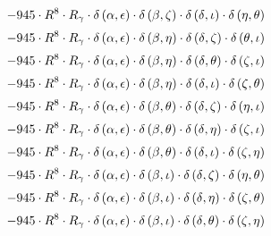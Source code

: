 \begin{subequations}
\begin{gather}
 \\[0.2em] \notag 		 - 945 \cdot R^{8} \cdot R_{\gamma{}} \cdot \delta{}\left(\alpha{}, \epsilon{}\right) \cdot \delta{}\left(\beta{}, \zeta{}\right) \cdot \delta{}\left(\delta{}, \iota{}\right) \cdot \delta{}\left(\eta{}, \theta{}\right) 
 \\[0.2em] \notag 		 - 945 \cdot R^{8} \cdot R_{\gamma{}} \cdot \delta{}\left(\alpha{}, \epsilon{}\right) \cdot \delta{}\left(\beta{}, \eta{}\right) \cdot \delta{}\left(\delta{}, \zeta{}\right) \cdot \delta{}\left(\theta{}, \iota{}\right) 
 \\[0.2em] \notag 		 - 945 \cdot R^{8} \cdot R_{\gamma{}} \cdot \delta{}\left(\alpha{}, \epsilon{}\right) \cdot \delta{}\left(\beta{}, \eta{}\right) \cdot \delta{}\left(\delta{}, \theta{}\right) \cdot \delta{}\left(\zeta{}, \iota{}\right) 
 \\[0.2em] \notag 		 - 945 \cdot R^{8} \cdot R_{\gamma{}} \cdot \delta{}\left(\alpha{}, \epsilon{}\right) \cdot \delta{}\left(\beta{}, \eta{}\right) \cdot \delta{}\left(\delta{}, \iota{}\right) \cdot \delta{}\left(\zeta{}, \theta{}\right) 
 \\[0.2em] \notag 		 - 945 \cdot R^{8} \cdot R_{\gamma{}} \cdot \delta{}\left(\alpha{}, \epsilon{}\right) \cdot \delta{}\left(\beta{}, \theta{}\right) \cdot \delta{}\left(\delta{}, \zeta{}\right) \cdot \delta{}\left(\eta{}, \iota{}\right) 
 \\[0.2em] \notag 		 - 945 \cdot R^{8} \cdot R_{\gamma{}} \cdot \delta{}\left(\alpha{}, \epsilon{}\right) \cdot \delta{}\left(\beta{}, \theta{}\right) \cdot \delta{}\left(\delta{}, \eta{}\right) \cdot \delta{}\left(\zeta{}, \iota{}\right) 
 \\[0.2em] \notag 		 - 945 \cdot R^{8} \cdot R_{\gamma{}} \cdot \delta{}\left(\alpha{}, \epsilon{}\right) \cdot \delta{}\left(\beta{}, \theta{}\right) \cdot \delta{}\left(\delta{}, \iota{}\right) \cdot \delta{}\left(\zeta{}, \eta{}\right) 
 \\[0.2em] \notag 		 - 945 \cdot R^{8} \cdot R_{\gamma{}} \cdot \delta{}\left(\alpha{}, \epsilon{}\right) \cdot \delta{}\left(\beta{}, \iota{}\right) \cdot \delta{}\left(\delta{}, \zeta{}\right) \cdot \delta{}\left(\eta{}, \theta{}\right) 
 \\[0.2em] \notag 		 - 945 \cdot R^{8} \cdot R_{\gamma{}} \cdot \delta{}\left(\alpha{}, \epsilon{}\right) \cdot \delta{}\left(\beta{}, \iota{}\right) \cdot \delta{}\left(\delta{}, \eta{}\right) \cdot \delta{}\left(\zeta{}, \theta{}\right) 
 \\[0.2em] \notag 		 - 945 \cdot R^{8} \cdot R_{\gamma{}} \cdot \delta{}\left(\alpha{}, \epsilon{}\right) \cdot \delta{}\left(\beta{}, \iota{}\right) \cdot \delta{}\left(\delta{}, \theta{}\right) \cdot \delta{}\left(\zeta{}, \eta{}\right) 

\end{gather}
\end{subequations}

